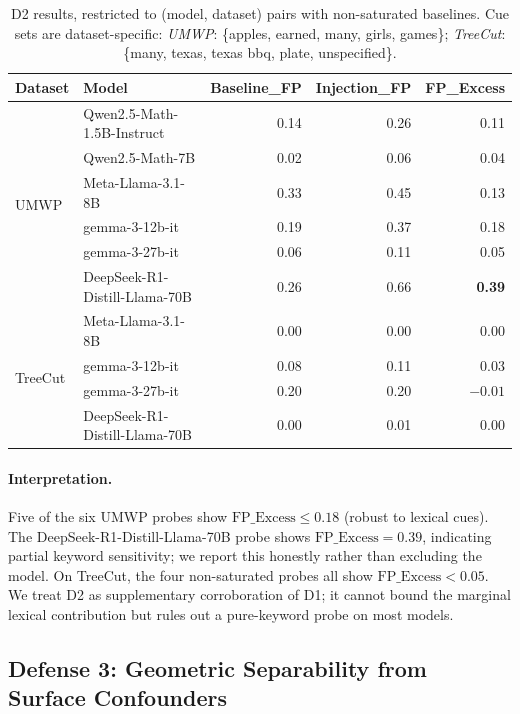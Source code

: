 \begin{table}[h]
\centering
\small
\caption{D2 results, restricted to (model, dataset) pairs with
non-saturated baselines. Cue sets are dataset-specific:
\textit{UMWP}: \{apples, earned, many, girls, games\};
\textit{TreeCut}: \{many, texas, texas bbq, plate, unspecified\}.}
\label{tab:d2}
\begin{tabular}{llrrr}
\toprule
Dataset & Model & Baseline\_FP & Injection\_FP & FP\_Excess \\
\midrule
\multirow{6}{*}{UMWP}
 & Qwen2.5-Math-1.5B-Instruct       & 0.14 & 0.26 & 0.11 \\
 & Qwen2.5-Math-7B                  & 0.02 & 0.06 & 0.04 \\
 & Meta-Llama-3.1-8B                & 0.33 & 0.45 & 0.13 \\
 & gemma-3-12b-it                   & 0.19 & 0.37 & 0.18 \\
 & gemma-3-27b-it                   & 0.06 & 0.11 & 0.05 \\
 & DeepSeek-R1-Distill-Llama-70B    & 0.26 & 0.66 & \textbf{0.39} \\
\midrule
\multirow{4}{*}{TreeCut}
 & Meta-Llama-3.1-8B                & 0.00 & 0.00 & 0.00 \\
 & gemma-3-12b-it                   & 0.08 & 0.11 & 0.03 \\
 & gemma-3-27b-it                   & 0.20 & 0.20 & $-0.01$ \\
 & DeepSeek-R1-Distill-Llama-70B    & 0.00 & 0.01 & 0.00 \\
\bottomrule
\end{tabular}
\end{table}

\paragraph{Interpretation.}
Five of the six UMWP probes show $\mathrm{FP\_Excess} \le 0.18$
(robust to lexical cues). The DeepSeek-R1-Distill-Llama-70B probe shows
$\mathrm{FP\_Excess} = 0.39$, indicating partial keyword sensitivity;
we report this honestly rather than excluding the model. On TreeCut,
the four non-saturated probes all show $\mathrm{FP\_Excess} < 0.05$.
We treat D2 as supplementary corroboration of D1; it cannot bound the
marginal lexical contribution but rules out a pure-keyword probe on
most models.

\subsection{Defense 3: Geometric Separability from Surface Confounders}
\label{sec:d3}

